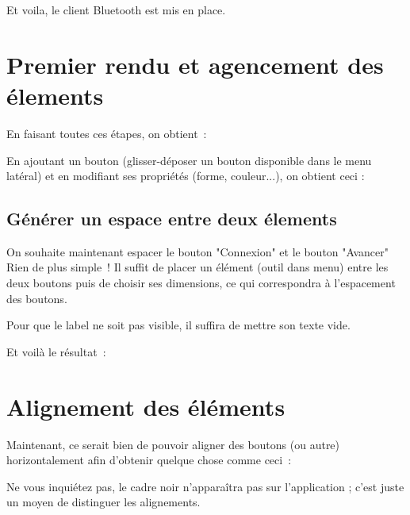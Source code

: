 
Et voila, le client Bluetooth est mis en place.

\section{Premier rendu et agencement des élements}

En faisant toutes ces étapes, on obtient : 


En ajoutant un bouton (glisser-déposer un bouton disponible dans le menu latéral) et en modifiant ses propriétés (forme, couleur...), on obtient ceci : 


\subsection{Générer un espace entre deux élements}

On souhaite maintenant espacer le bouton "Connexion" et le bouton "Avancer" \\

Rien de plus simple ! Il suffit de placer un élément 
(outil dans menu) entre les deux boutons puis de
choisir ses dimensions, ce qui correspondra à l'espacement des boutons. \\

Pour que le label ne soit pas visible, il suffira de mettre son texte vide.


Et voilà le résultat : 



\section{Alignement des éléments}

Maintenant, ce serait bien de pouvoir aligner des boutons (ou autre)
horizontalement afin d'obtenir quelque  chose comme ceci :


Ne vous inquiétez pas, le cadre noir n’apparaîtra pas sur l'application ; c'est juste un moyen de distinguer les alignements. \\


